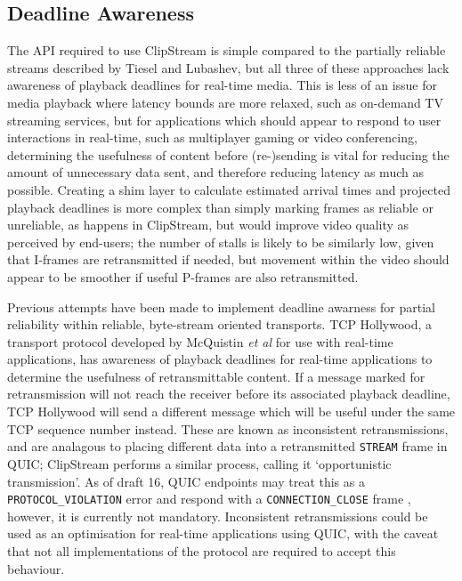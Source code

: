 \documentclass{mprop}
\begin{document}
\subsection{Deadline Awareness}

The API required to use ClipStream is simple compared to the partially reliable streams described by Tiesel and Lubashev, but all three of these approaches lack awareness of playback deadlines for real-time media. This is less of an issue for media playback where latency bounds are more relaxed, such as on-demand TV streaming services, but for applications which should appear to respond to user interactions in real-time, such as multiplayer gaming or video conferencing, determining the usefulness of content before (re-)sending is vital for reducing the amount of unnecessary data sent, and therefore reducing latency as much as possible. Creating a shim layer to calculate estimated arrival times and projected playback deadlines is more complex than simply marking frames as reliable or unreliable, as happens in ClipStream, but would improve video quality as perceived by end-users; the number of stalls is likely to be similarly low, given that I-frames are retransmitted if needed, but movement within the video should appear to be smoother if useful P-frames are also retransmitted.

Previous attempts have been made to implement deadline awarness for partial reliability within reliable, byte-stream oriented transports. TCP Hollywood, a transport protocol developed by McQuistin \textit{et al} \cite{McQuistin2016} for use with real-time applications, has awareness of playback deadlines for real-time applications to determine the usefulness of retransmittable content. If a message marked for retransmission will not reach the receiver before its associated playback deadline, TCP Hollywood will send a different message which will be useful under the same TCP sequence number instead. These are known as inconsistent retransmissions, and are analagous to placing different data into a retransmitted \texttt{STREAM} frame in QUIC; ClipStream performs a similar process, calling it `opportunistic transmission'. As of draft 16, QUIC endpoints may treat this as a \texttt{PROTOCOL\_VIOLATION} error and respond with a \texttt{CONNECTION\_CLOSE} frame \cite{quic-transport-16}, however, it is currently not mandatory. Inconsistent retransmissions could be used as an optimisation for real-time applications using QUIC, with the caveat that not all implementations of the protocol are required to accept this behaviour.
\end{document}
